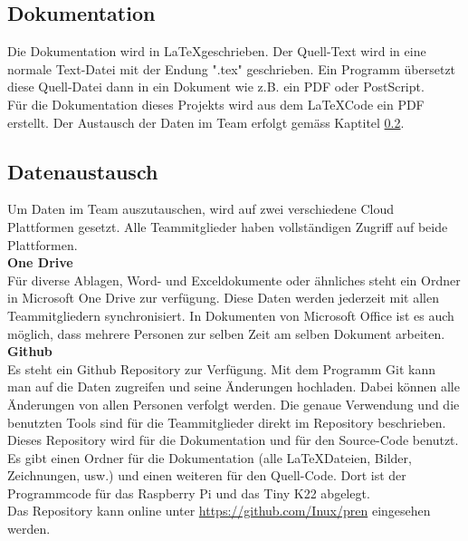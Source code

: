 \documentclass[../../main.tex]{subfiles}
\begin{document}
\subsection{Dokumentation}
Die Dokumentation wird in \LaTeX geschrieben. Der Quell-Text wird in eine normale Text-Datei mit der Endung ".tex" geschrieben. Ein Programm übersetzt diese Quell-Datei dann in ein Dokument wie z.B. ein PDF oder PostScript. \cite{whatislatex}\\
Für die Dokumentation dieses Projekts wird aus dem \LaTeX Code ein PDF erstellt. Der Austausch der Daten im Team erfolgt gemäss Kaptitel \ref{proj_datenaustausch}.

\subsection{Datenaustausch} \label{proj_datenaustausch}
Um Daten im Team auszutauschen, wird auf zwei verschiedene Cloud Plattformen gesetzt. Alle Teammitglieder haben vollständigen Zugriff auf beide Plattformen.\\

\textbf{One Drive}\\
Für diverse Ablagen, Word- und Exceldokumente oder ähnliches steht ein Ordner in Microsoft One Drive zur verfügung. Diese Daten werden jederzeit mit allen Teammitgliedern synchronisiert. In Dokumenten von Microsoft Office ist es auch möglich, dass mehrere Personen zur selben Zeit am selben Dokument arbeiten.\\

\textbf{Github}\\
Es steht ein Github Repository zur Verfügung. Mit dem Programm Git kann man auf die Daten zugreifen und seine Änderungen hochladen. Dabei können alle Änderungen von allen Personen verfolgt werden. Die genaue Verwendung und die benutzten Tools sind für die Teammitglieder direkt im Repository beschrieben.\\
Dieses Repository wird für die Dokumentation und für den Source-Code benutzt. Es gibt einen Ordner für die Dokumentation (alle \LaTeX Dateien, Bilder, Zeichnungen, usw.) und einen weiteren für den Quell-Code. Dort ist der Programmcode für das Raspberry Pi und das Tiny K22 abgelegt.\\
Das Repository kann online unter \url{https://github.com/Inux/pren} eingesehen werden.
\end{document}
